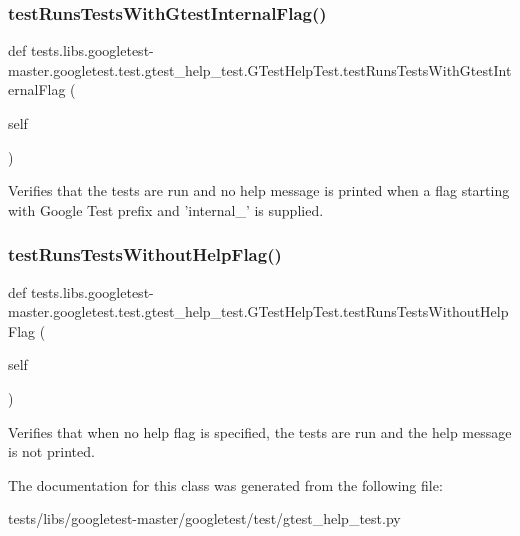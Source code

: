 \subsubsection{\texorpdfstring{test\+Runs\+Tests\+With\+Gtest\+Internal\+Flag()}{testRunsTestsWithGtestInternalFlag()}}
{\footnotesize\ttfamily def tests.\+libs.\+googletest-\/master.\+googletest.\+test.\+gtest\+\_\+help\+\_\+test.\+G\+Test\+Help\+Test.\+test\+Runs\+Tests\+With\+Gtest\+Internal\+Flag (\begin{DoxyParamCaption}\item[{}]{self }\end{DoxyParamCaption})}

\begin{DoxyVerb}Verifies that the tests are run and no help message is printed when
a flag starting with Google Test prefix and 'internal_' is supplied.\end{DoxyVerb}
 \mbox{\label{classtests_1_1libs_1_1googletest-master_1_1googletest_1_1test_1_1gtest__help__test_1_1GTestHelpTest_a08c28fbc7aacb80842b29ec41faf3fc8}} 
\subsubsection{\texorpdfstring{test\+Runs\+Tests\+Without\+Help\+Flag()}{testRunsTestsWithoutHelpFlag()}}
{\footnotesize\ttfamily def tests.\+libs.\+googletest-\/master.\+googletest.\+test.\+gtest\+\_\+help\+\_\+test.\+G\+Test\+Help\+Test.\+test\+Runs\+Tests\+Without\+Help\+Flag (\begin{DoxyParamCaption}\item[{}]{self }\end{DoxyParamCaption})}

\begin{DoxyVerb}Verifies that when no help flag is specified, the tests are run
and the help message is not printed.\end{DoxyVerb}
 

The documentation for this class was generated from the following file\+:\begin{DoxyCompactItemize}
\item 
tests/libs/googletest-\/master/googletest/test/gtest\+\_\+help\+\_\+test.\+py\end{DoxyCompactItemize}
